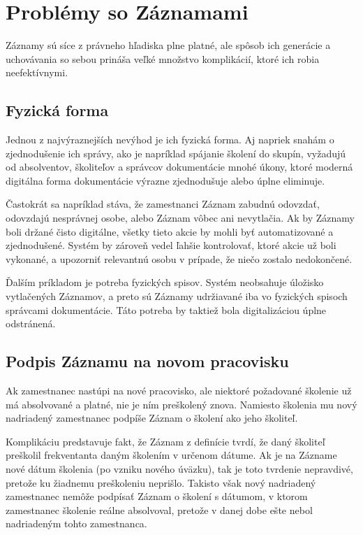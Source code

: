 \documentclass[
  digital,     %
  oneside,     %
  nosansbold,  %
  nocolorbold, %
  lof,         %
  nolot,         %
]{fithesis4}
\begin{document}
\section{Problémy so Záznamami}
Záznamy sú síce z právneho hľadiska plne platné, ale spôsob ich generácie a uchovávania so sebou prináša veľké množstvo komplikácií, ktoré ich robia neefektívnymi.

\subsection*{Fyzická forma}
Jednou z najvýraznejších nevýhod je ich fyzická forma. Aj napriek snahám o zjednodušenie ich správy, ako je napríklad spájanie školení do skupín, vyžadujú od absolventov, školiteľov a správcov dokumentácie mnohé úkony, ktoré moderná digitálna forma dokumentácie výrazne zjednodušuje alebo úplne eliminuje.

Častokrát sa napríklad stáva, že zamestnanci Záznam zabudnú odovzdať, odovzdajú nesprávnej osobe, alebo Záznam vôbec ani nevytlačia. Ak by Záznamy boli držané čisto digitálne, všetky tieto akcie by mohli byť automatizované a zjednodušené. Systém by zároveň vedel ľahšie kontrolovať, ktoré akcie už boli vykonané, a upozorniť relevantnú osobu v prípade, že niečo zostalo nedokončené.

Ďalším príkladom je potreba fyzických spisov. Systém neobsahuje úložisko vytlačených Záznamov, a preto sú Záznamy udržiavané iba vo fyzických spisoch správcami dokumentácie. Táto potreba by taktiež bola digitalizáciou úplne odstránená.

\subsection*{Podpis Záznamu na novom pracovisku}
Ak zamestnanec nastúpi na nové pracovisko, ale niektoré požadované školenie už má absolvované a platné, nie je ním preškolený znova. Namiesto školenia mu nový nadriadený zamestnanec podpíše Záznam o školení ako jeho školiteľ.

Komplikáciu predstavuje fakt, že Záznam z definície tvrdí, že daný školiteľ preškolil frekventanta daným školením v určenom dátume. Ak je na Zázname nové dátum školenia (po vzniku nového úväzku), tak je toto tvrdenie nepravdivé, pretože ku žiadnemu preškoleniu neprišlo. Takisto však nový nadriadený zamestnanec nemôže podpísať Záznam o školení s dátumom, v ktorom zamestnanec školenie reálne absolvoval, pretože v danej dobe ešte nebol nadriadeným tohto zamestnanca.
\end{document}
